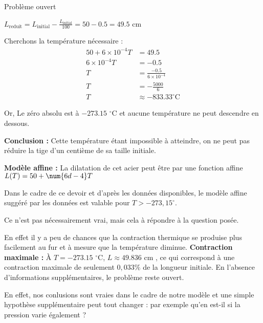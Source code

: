 \begin{EXO}{Problème ouvert}{}
\begin{tcbenumerate}[2]
\begin{tcolorbox}[
    colback=red!10,
    colframe=red!50!black,
    title={\faSnowflake\space Analyse de la contraction thermique :}
]
$L_{\text{reduit}} = L_{\text{initial}} - \frac{L_{\text{initial}}}{100} = 50 - 0.5 = \num{49.5}$ cm

    Cherchons la température nécessaire :
\begin{align*}
50 + 6 \times 10^{-4} T &= \num{49.5}\\[0.15cm]
6 \times 10^{-4} T &= -\num{0.5}\\[0.15cm]
T &= \frac{-\num{0.5}}{6 \times 10^{-4}}\\[0.15cm]
T &= -\frac{5000}{6}\\[0.15cm]
T &\approx \boxed{-\num{833.33} ^\circ\text{C}}
\end{align*}

Or, Le zéro absolu est à $-\num{273.15}$ $^\circ$C et aucune température ne peut descendre en dessous. 

\textbf{Conclusion :} Cette température étant impossible à atteindre, on ne peut pas réduire la tige d'un centième de sa taille initiale.

\end{tcolorbox}
\end{tcbenumerate}

\vspace{0.5cm}

\begin{tcolorbox}[
    colback=purple!10,
    colframe=purple!50!black,
    title={\faGraduationCap\space Remarques :}
]
\begin{tcbenumerate}
    \tcbitem[colback=purple!10] \textbf{Modèle affine :} La dilatation de cet acier peut être  par une fonction affine $L(T) = 50 + \num{6d-4}T$

    Dans le cadre de ce devoir et d'après les données disponibles,  le modèle affine suggéré par les données est valable pour $T>-273{,}15^\circ$.

    Ce n'est pas nécessairement vrai, mais cela  à répondre à la question posée. 

    En effet il y a peu de chances que la contraction thermique se produise plus facilement au fur et à mesure que la température diminue. 
    \tcbitem[colback=purple!10] \textbf{Contraction maximale :} À $T = -273.15$ $^\circ$C, $L \approx \num{49.836}$ cm , ce qui correspond à une contraction maximale de seulement $0{,}033\%$ de la longueur initiale.
    \tcbitem[colback=purple!10] En l'absence d'informations supplémentaires, le problème reste ouvert. 

    En effet, nos conlusions sont vraies dans le cadre de notre modèle et une simple hypothèse supplémentaire peut tout changer : par exemple qu'en est-il si la pression varie également ?
\end{tcbenumerate}
\end{tcolorbox}


\end{EXO}
